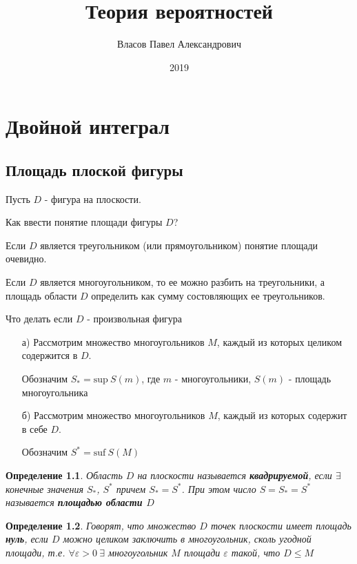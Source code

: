 \documentclass[a4paper, 14pt]{report}
\author{Власов Павел Александрович}
\title{Теория вероятностей}
\date{2019}
\newtheorem{defenition}{Определение}[section]
\begin{document}
\maketitle

\tableofcontents
\clearpage

\chapter{Двойной интеграл}

\section{Площадь плоской фигуры}

Пусть $D$ - фигура на плоскости.

Как ввести понятие площади фигуры $D$?

Если $D$ является треугольником (или прямоугольником) понятие площади очевидно.

Если $D$ является многоугольником, то ее можно разбить на треугольники, а площадь области $D$ определить как сумму состовляющих ее треугольников.

Что делать если $D$ - произвольная фигура

\begin{enumerate}

    \item[а)] Рассмотрим множество многоугольников $M$, каждый из которых целиком содержится в $D$.

    Обозначим $S_* = \text{sup}\ S(m)$, где $m$ - многоугольники, $S(m)$ - площадь многоугольника

    \item[б)] Рассмотрим множество многоугольников $M$, каждый из которых содержит в себе $D$.

    Обозначим $S^* = \text{suf}\ S(M)$

\end{enumerate}

\begin{defenition}
    Область $D$ на плоскости называется \textbf{квадрируемой}, если $\exists$ конечные значения $S_*$, $S^*$ причем $S_* = S^*$. При этом число $S = S_* = S^*$ называется \textbf{площадью области $D$}
\end{defenition}

\hfill

\begin{defenition}
    Говорят, что множество $D$ точек плоскости имеет площадь \textbf{нуль}, если $D$ можно целиком заключить в многоугольник, сколь угодной площади, т.е. $\forall \varepsilon > 0\ \exists$ многоугольник $M$ площади $\varepsilon$ такой, что $D \le M$
\end{defenition}
\end{document}
